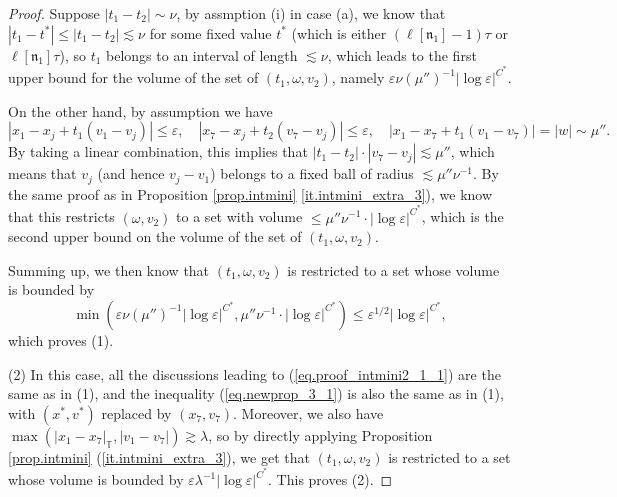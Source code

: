 \documentclass[10pt, reqno]{amsart}
\newcommand{\Tb}{\mathbb T}
\newcommand{\nf}{\mathfrak n}
\theoremstyle{definition}
\theoremstyle{remark}
\numberwithin{equation}{section}
\begin{document}
\begin{proof}
Suppose $|t_1-t_2|\sim\nu$, by assmption (i) in case (a), we know that $|t_1-t^*|\leq |t_1-t_2|\lesssim\nu$ for some fixed value $t^*$ (which is either $(\ell[\nf_1]-1)\tau$ or $\ell[\nf_1]\tau$), so $t_1$ belongs to an interval of length $\lesssim\nu$, which leads to the first upper bound for the volume of the set of $(t_1,\omega,v_2)$, namely $\varepsilon\nu(\mu'')^{-1}|\log\varepsilon|^{C^*}$.

On the other hand, by assumption we have
\begin{equation}\label{eq.intmini_lin}|x_1-x_j+t_1(v_1-v_j)|\leq\varepsilon,\quad |x_7-x_j+t_2(v_7-v_j)|\leq\varepsilon,\quad |x_1-x_7+t_1(v_1-v_7)|=|w|\sim\mu''.\end{equation}By taking a linear combination, this implies that $|t_1-t_2|\cdot|v_7-v_j|\lesssim\mu''$, which means that $v_j$ (and hence $v_j-v_1$) belongs to a fixed ball of radius $\lesssim \mu''\nu^{-1}$. By the same proof as in Proposition \ref{prop.intmini} \ref{it.intmini_extra_3}), we know that this restricts $(\omega,v_2)$ to a set with volume $\leq \mu''\nu^{-1}\cdot |\log\varepsilon|^{C^*}$, which is the second upper bound on the volume of the set of $(t_1,\omega,v_2)$.

Summing up, we then know that $(t_1,\omega,v_2)$ is restricted to a set whose volume is bounded by
\[\min(\varepsilon\nu(\mu'')^{-1}|\log\varepsilon|^{C^*},\mu''\nu^{-1}\cdot |\log\varepsilon|^{C^*})\leq\varepsilon^{1/2}|\log\varepsilon|^{C^*},\] which proves (1).

(2) In this case, all the discussions leading to (\ref{eq.proof_intmini2_1_1}) are the same as in (1), and the inequality (\ref{eq.newprop_3_1}) is also the same as in (1), with $(x^*,v^*)$ replaced by $(x_7,v_7)$. Moreover, we also have $\max(|x_1-x_7|_\Tb,|v_1-v_7|)\gtrsim\lambda$, so by directly applying Proposition \ref{prop.intmini} (\ref{it.intmini_extra_3}), we get that $(t_1,\omega,v_2)$ is restricted to a set whose volume is bounded by $\varepsilon\lambda^{-1}|\log\varepsilon|^{C^*}$. This proves (2).


\end{proof}
\end{document}
